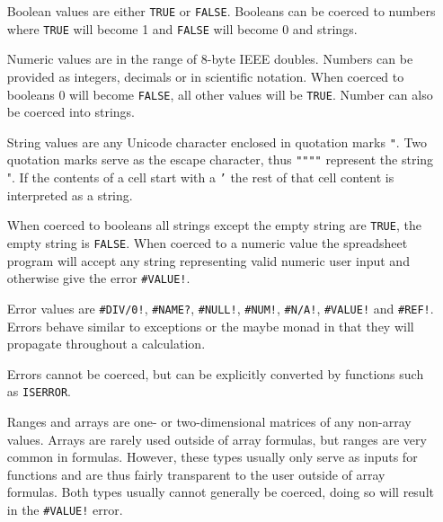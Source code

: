 \documentclass[12pt,a4paper,onecolumn,oneside]{memoir}
\newcommand{\f}[1]{\texttt{#1}}
\begin{document}
\begin{itemize}
\item[Boolean] values are either \f{TRUE} or \f{FALSE}. Booleans can be coerced to numbers where \f{TRUE} will become 1 and \f{FALSE} will become 0 and strings.
\item[Numeric] values are in the range of 8-byte IEEE doubles. Numbers can be provided as integers, decimals or in scientific notation.
When coerced to booleans 0 will become \f{FALSE}, all other values will be \f{TRUE}. Number can also be coerced into strings.
\item[String] values are any Unicode character enclosed in quotation marks \f{"}.
Two quotation marks serve as the escape character, thus \f{""""} represent the string ".
If the contents of a cell start with a \texttt{'} the rest of that cell content is interpreted as a string.

When coerced to booleans all strings except the empty string are \f{TRUE}, the empty string is \f{FALSE}.
When coerced to a numeric value the spreadsheet program will accept any string representing valid numeric user input and otherwise give the error \f{\#VALUE!}.
\item[Error] values are \f{\#DIV/0!}, \f{\#NAME?}, \f{\#NULL!}, \f{\#NUM!}, \f{\#N/A!}, \f{\#VALUE!} and \f{\#REF!}.
Errors behave similar to exceptions or the maybe monad in that they will propagate throughout a calculation.

Errors cannot be coerced, but can be explicitly converted by functions such as \f{ISERROR}.

\item[Ranges and arrays] are one- or two-dimensional matrices of any non-array values. Arrays are rarely used outside of array formulas, but ranges are very common in formulas.
However, these types usually only serve as inputs for functions and are thus fairly transparent to the user outside of array formulas.
Both types usually cannot generally be coerced, doing so will result in the \f{\#VALUE!} error.
\end{itemize}
\end{document}
